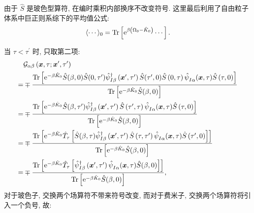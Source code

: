 由于 $\hat{S}$ 是玻色型算符, 在编时乘积内部换序不改变符号. 这里最后利用了自由粒子体系中巨正则系综下的平均值公式:
\begin{equation}
\langle\cdots\rangle_0=\operatorname{Tr}\left[\mathrm{e}^{\beta\left(\Omega_0-\hat{K}_0\right)} \cdots\right] .
\end{equation}

当 $\tau<\tau^{\prime}$ 时, 只取第二项:
\begin{align}
&\mathcal{G}_{\alpha \beta}\left(\boldsymbol{x}, \tau ; \boldsymbol{x}^{\prime}, \tau^{\prime}\right) \nonumber\\
=& \mp\frac{\operatorname{Tr}\left[\mathrm{e}^{-\beta \hat{K}_0} \hat{S}(\beta, 0) \hat{S}(0, \tau^\prime)\hat{\psi}_{I \beta}^{\dagger}\left(\boldsymbol{x}^{\prime}, \tau^{\prime}\right)  \hat{S}(\tau^{\prime}, 0) \hat{S}\left(0, \tau\right) \hat{\psi}^{}_{I \alpha}(\boldsymbol{x}, \tau) \hat{S}\left(\tau, 0\right)\right]}{\operatorname{Tr}\left[\mathrm{e}^{-\beta \hat{K}_0} \hat{S}(\beta, 0)\right]} \nonumber\\
=& \mp\frac{\operatorname{Tr}\left[\mathrm{e}^{-\beta \hat{K}_0} \hat{S}(\beta, \tau^\prime) \hat{\psi}_{I \beta}^{\dagger}\left(\boldsymbol{x}^{\prime}, \tau^{\prime}\right) \hat{S}\left(\tau^{\prime}, \tau\right)\hat{\psi}^{}_{I \alpha}(\boldsymbol{x}, \tau)  \hat{S}\left(\tau, 0\right)\right]}{\operatorname{Tr}\left[\mathrm{e}^{-\beta \hat{K}_0} \hat{S}(\beta, 0)\right]}\nonumber\\
=& \mp\frac{\operatorname{Tr}\left[\mathrm{e}^{-\beta \hat{K}_0} \hat{T}_\tau\left[\hat{S}(\beta, \tau) \hat{\psi}_{I \beta}^{\dagger}\left(\boldsymbol{x}^{\prime}, \tau^{\prime}\right) \hat{S}\left(\tau, \tau^{\prime}\right) \hat{\psi}^{}_{I \alpha}(\boldsymbol{x}, \tau)  \hat{S}\left(\tau^{\prime}, 0\right)\right]\right]}{\operatorname{Tr}\left[\mathrm{e}^{-\beta \hat{K}_0} \hat{S}(\beta, 0)\right]} \nonumber\\
=& \mp\frac{\operatorname{Tr}\left[\mathrm{e}^{-\beta \hat{K}_0} \hat{T}_\tau\left[\hat{\psi}_{I \beta}^{\dagger}\left(\boldsymbol{x}^{\prime}, \tau^{\prime}\right)\hat{\psi}^{}_{I \alpha}(\boldsymbol{x}, \tau)  \hat{S}(\beta, 0)\right]\right]}{\operatorname{Tr}\left[\mathrm{e}^{-\beta \hat{K}_0} \hat{S}(\beta, 0)\right]} ,
\end{align}
对于玻色子, 交换两个场算符不带来符号改变, 而对于费米子, 交换两个场算符将引入一个负号, 故:
